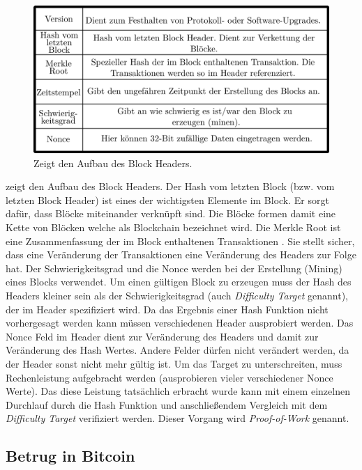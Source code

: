 \documentclass[ngerman,runningheads,a4paper]{llncs}[2018/03/10]
\begin{document}
\begin{figure}
  \centering
  \includegraphics[width=.8\textwidth]{grafiken/tableBlock.png}
  \caption{Zeigt den Aufbau des Block Headers.}
  \label{fig:blockTable}
\end{figure}

 zeigt den Aufbau des Block Headers. Der Hash vom letzten Block (bzw. vom letzten Block Header) ist eines der wichtigsten Elemente im Block. Er sorgt dafür, dass Blöcke miteinander verknüpft sind. Die Blöcke formen damit eine Kette von Blöcken welche als Blockchain bezeichnet wird. Die Merkle Root ist eine Zusammenfassung der im Block enthaltenen Transaktionen \citep{bitcoinbook}. Sie stellt sicher, dass eine Veränderung der Transaktionen eine Veränderung des Headers zur Folge hat. Der Schwierigkeitsgrad und die Nonce werden bei der Erstellung (Mining) eines Blocks verwendet. Um einen gültigen Block zu erzeugen muss der Hash des Headers kleiner sein als der Schwierigkeitsgrad (auch \textit{Difficulty Target} genannt), der im Header spezifiziert wird. Da das Ergebnis einer Hash Funktion nicht vorhergesagt werden kann müssen verschiedenen Header ausprobiert werden. Das Nonce Feld im Header dient zur Veränderung des Headers und damit zur Veränderung des Hash Wertes. Andere Felder dürfen nicht verändert werden, da der Header sonst nicht mehr gültig ist. Um das Target zu unterschreiten, muss Rechenleistung aufgebracht werden (ausprobieren vieler verschiedener Nonce Werte). Das diese Leistung tatsächlich erbracht wurde kann mit einem einzelnen Durchlauf durch die Hash Funktion und anschließendem Vergleich mit dem \textit{Difficulty Target} verifiziert werden. Dieser Vorgang wird \textit{Proof-of-Work} genannt.

\subsection{Betrug in Bitcoin}\label{sec:betrug}
\end{document}
